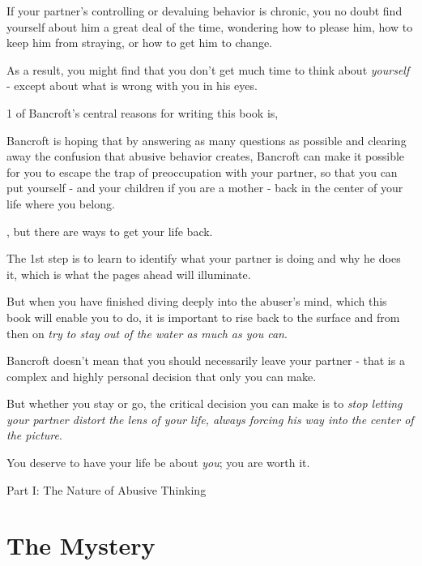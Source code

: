 \documentclass[oneside]{article}
\numberwithin{equation}{section}
\begin{document}
%
If your partner's controlling or devaluing behavior is chronic, you no doubt find yourself about him a great deal of the time, wondering how to please him, how to keep him from straying, or how to get him to change.

As a result, you might find that you don't get much time to think about \textit{yourself} - except about what is wrong with you in his eyes.

1 of Bancroft's central reasons for writing this book is, 


Bancroft is hoping that by answering as many questions as possible and clearing away the confusion that abusive behavior creates, Bancroft can make it possible for you to escape the trap of preoccupation with your partner, so that you can put yourself - and your children if you are a mother - back in the center of your life where you belong.

, but there are ways to get your life back.

The 1st step is to learn to identify what your partner is doing and why he does it, which is what the pages ahead will illuminate.

But when you have finished diving deeply into the abuser's mind, which this book will enable you to do, it is important to rise back to the surface and from then on \textit{try to stay out of the water as much as you can}.

Bancroft doesn't mean that you should necessarily leave your partner - that is a complex and highly personal decision that only you can make.

But whether you stay or go, the critical decision you can make is to \textit{stop letting your partner distort the lens of your life, always forcing his way into the center of the picture}.

You deserve to have your life be about \textit{you}; you are worth it.

\begin{center}
    Part I: The Nature of Abusive Thinking
\end{center}

\section{The Mystery}
\end{document}
